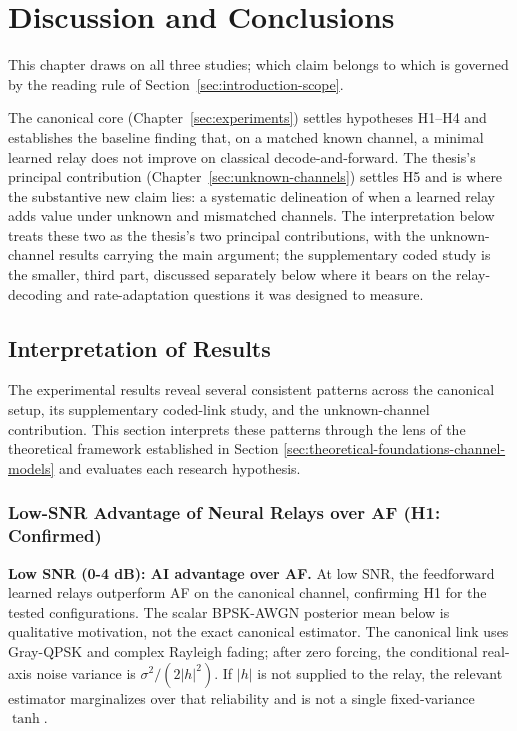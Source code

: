 \chapter{Discussion and Conclusions}\label{sec:discussion-and-conclusions}

This chapter draws on all three studies; which claim belongs to which is governed by the reading rule of Section~\ref{sec:introduction-scope}.

The canonical core (Chapter~\ref{sec:experiments}) settles hypotheses H1--H4 and establishes the baseline finding that, on a matched known channel, a minimal learned relay does not improve on classical decode-and-forward. The thesis's principal contribution (Chapter~\ref{sec:unknown-channels}) settles H5 and is where the substantive new claim lies: a systematic delineation of when a learned relay adds value under unknown and mismatched channels. The interpretation below treats these two as the thesis's two principal contributions, with the unknown-channel results carrying the main argument; the supplementary coded study is the smaller, third part, discussed separately below where it bears on the relay-decoding and rate-adaptation questions it was designed to measure.

\section{Interpretation of Results}\label{sec:interpretation-of-results}

The experimental results reveal several consistent patterns across the canonical setup, its supplementary coded-link study, and the unknown-channel contribution. This section interprets these patterns through the lens of the theoretical framework established in Section \ref{sec:theoretical-foundations-channel-models}  and evaluates each research hypothesis.

\subsection{Low-SNR Advantage of Neural Relays over AF (H1: Confirmed)}\label{sec:low-snr-advantage-of-neural-relays-h1-confirmed}

\textbf{Low SNR (0-4 dB): AI advantage over AF.} At low SNR, the feedforward learned relays outperform AF on the canonical channel, confirming H1 for the tested configurations. The scalar BPSK-AWGN posterior mean below is qualitative motivation, not the exact canonical estimator. The canonical link uses Gray-QPSK and complex Rayleigh fading; after zero forcing, the conditional real-axis noise variance is $\sigma^{2}/(2|h|^{2})$. If \(|h|\) is not supplied to the relay, the relevant estimator marginalizes over that reliability and is not a single fixed-variance \(\tanh\).

